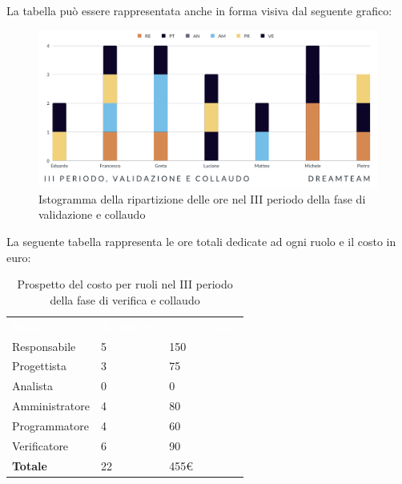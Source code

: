La tabella può essere rappresentata anche in forma visiva dal seguente grafico:
\begin{figure}[H]
\centering
\includegraphics[scale=0.65]{Sezioni/SezioniPreventivo/grafici/Validazione_collaudo_III_periodo.png}
\caption{Istogramma della ripartizione delle ore nel III periodo della fase di validazione e collaudo}
\end{figure}

La seguente tabella rappresenta le ore totali dedicate ad ogni ruolo e il costo in euro:

\begin{table}[H]
\begin{center}
\renewcommand{\arraystretch}{1.5}
\begin{tabular}{ m{}<{\centering}  m{}<{\centering} m{}<{\centering}}
	\rowcolor{darkblue}
	\textcolor{white}{\textbf{Ruolo}}&\textcolor{white}{\textbf{Totale ore}}&\textcolor{white}{\textbf{Costo totale}}\\ 

	Responsabile  & 5 & 150 \\	
	
	Progettista & 3 & 75 \\
	
	Analista & 0 & 0 \\

	Amministratore & 4 & 80 \\
	
	Programmatore & 4 & 60 \\
	
	Verificatore & 6 & 90 \\
	
	\textbf{Totale} & 22 & 455\euro \\
	
\end{tabular}
\caption{Prospetto del costo per ruoli nel III periodo della fase di verifica e collaudo}
\end{center}
\end{table}

